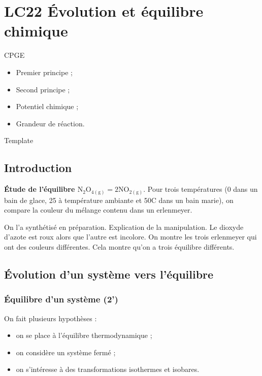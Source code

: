 \section{LC22 Évolution et équilibre chimique}

\niveau CPGE

\prerequis
\begin{itemize}
\item Premier principe ;
\item Second principe ;
\item Potentiel chimique ;
\item Grandeur de réaction.
\end{itemize}

\objectif Template

\footnotesize{}

\subsection{Introduction}

\begin{experience}
\textbf{Étude de l'équilibre $\mathrm{N_2O_{4(g)} = 2NO_{2(g)}}$}.
Pour trois températures (0 dans un bain de glace, 25 à température ambiante et \unit{50}{\degree C} dans un bain marie), on compare la couleur du mélange contenu dans un erlenmeyer.

On l'a synthétisé en préparation.
Explication de la manipulation.
Le dioxyde d'azote est roux alors que l'autre est incolore.
On montre les trois erlenmeyer qui ont des couleurs différentes.
Cela montre qu'on a trois équilibre différents.
\end{experience}

\subsection{Évolution d'un système vers l'équilibre}
\subsubsection{Équilibre d'un système (2')}

On fait plusieurs hypothèses :
\begin{itemize}
\item on se place à l'équilibre thermodynamique ;
\item on considère un système fermé ;
\item on s'intéresse à des transformations isothermes et isobares.
\end{itemize}

